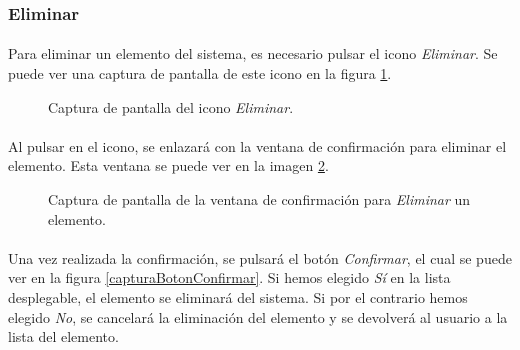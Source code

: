 \subsubsection{Eliminar}

  \paragraph{}Para eliminar un elemento del sistema,  es necesario pulsar el
  icono \textit{Eliminar}. Se puede ver una captura de pantalla de este
  icono en la figura \ref{capturaDelElemento}.

  \begin{figure}[!ht]
    \begin{center}
      \caption{Captura de pantalla del icono \textit{Eliminar}.}
      \label{capturaDelElemento}
    \end{center}
  \end{figure}

  \paragraph{}Al pulsar en el icono, se enlazará con la ventana de confirmación
  para eliminar el elemento. Esta ventana se puede ver en la imagen
  \ref{capturaConfirmacion}.

  \begin{figure}[!ht]
    \begin{center}
      \caption{Captura de pantalla de la ventana de confirmación para \textit{Eliminar} un elemento.}
      \label{capturaConfirmacion}
    \end{center}
  \end{figure}

  \paragraph{}Una vez realizada la confirmación, se pulsará el botón
  \textit{Confirmar}, el cual se puede ver en la figura
  \ref{capturaBotonConfirmar}. Si hemos elegido \textit{Sí} en la lista
  desplegable, el elemento se eliminará del sistema. Si por el contrario hemos
  elegido \textit{No}, se cancelará la eliminación del elemento y se devolverá
  al usuario a la lista del elemento.
